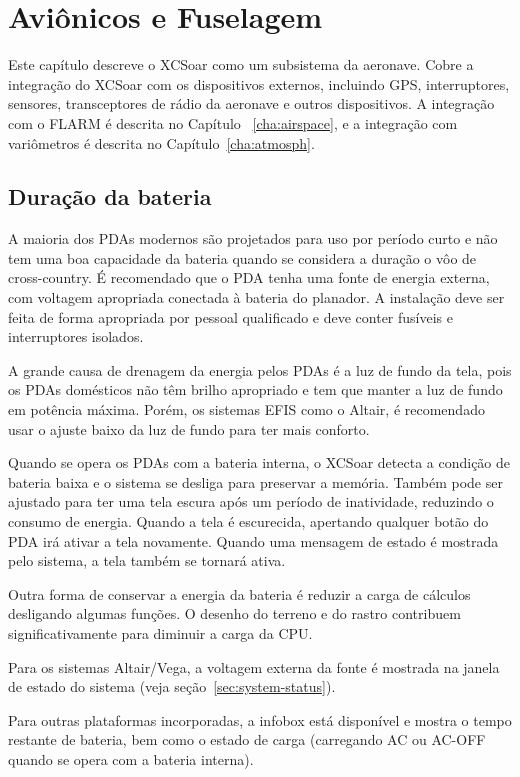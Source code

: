 \chapter{Aviônicos e Fuselagem}\label{cha:avionics-airframe}

Este capítulo descreve o XCSoar como um subsistema da aeronave.  Cobre a integração do XCSoar com os dispositivos externos, incluindo GPS, interruptores, sensores, transceptores de rádio da aeronave e outros dispositivos.  A integração com o FLARM é descrita no Capítulo ~\ref{cha:airspace}, e a integração com variômetros é descrita no Capítulo~\ref{cha:atmosph}.

\section{Duração da bateria}

A maioria dos PDAs modernos são projetados para uso por período curto e não tem uma boa capacidade da bateria quando se considera a duração o vôo de cross-country.  É recomendado que o PDA tenha uma fonte de energia externa, com voltagem apropriada conectada à bateria do planador.  A instalação deve ser feita de forma apropriada por pessoal qualificado e deve conter fusíveis e interruptores isolados.

A grande causa de drenagem da energia pelos PDAs é a luz de fundo da tela, pois os PDAs domésticos não têm brilho apropriado e tem que manter a luz de fundo em potência máxima.  Porém, os sistemas EFIS como o Altair, é recomendado usar o ajuste baixo da luz de fundo para ter mais conforto.

Quando se opera os PDAs com a bateria interna, o XCSoar detecta a condição de bateria baixa e o sistema se desliga para preservar a memória.  Também pode ser ajustado para ter uma tela escura após um período de inatividade, reduzindo o consumo de energia.  Quando a tela é escurecida, apertando qualquer botão do PDA irá ativar a tela novamente.  Quando uma mensagem de estado é mostrada pelo sistema, a tela também se tornará ativa.

Outra forma de conservar a energia da bateria é reduzir a carga de cálculos desligando algumas funções.  O desenho do terreno e do rastro contribuem significativamente para diminuir a carga da CPU.

Para os sistemas Altair/Vega, a voltagem externa da fonte é mostrada na janela de estado do sistema (veja seção~\ref{sec:system-status}).

Para outras plataformas incorporadas, a infobox  está disponível e mostra o tempo restante de bateria, bem como o estado de carga (carregando AC ou AC-OFF quando se opera com a bateria interna).  

